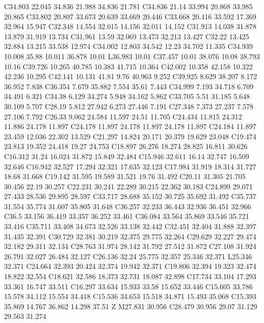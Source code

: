 {\begin{scope}[cm={0.569055,0,0,-0.569055,(-0.5cm,0.5cm)}]
{      C34.803 22.045 34.836 21.988 34.836 21.781 C34.836 21.14 33.994 20.868 33.985 20.865
      C33.802 20.807 33.673 20.639 33.669 20.446 C33.668 20.416 33.592 17.369 32.964 15.947
      C32.348 14.554 32.015 14.156 32.011 14.152 C31.913 14.038 31.878 13.879 31.919 13.734
      C31.961 13.59 32.069 13.473 32.213 13.427 C32.22 13.425 32.884 13.215 33.538 12.974
      C34.002 12.803 34.542 12.23 34.702 11.335 C34.939 10.008 35.88 10.011 36.878 10.01
      L36.983 10.01 C37.457 10.01 38.076 10.08 38.793 10.16
      C39.726 10.265 40.785 10.383 41.715 10.364 C42.002 10.358 42.158 10.322 42.236 10.295
      C42.141 10.131 41.81 9.76 40.963 9.252 C39.925 8.629 38.207 8.172 36.952 7.838
      C36.354 7.679 35.882 7.554 35.61 7.443 C34.999 7.193 34.718 6.709 34.491 6.321
      C34.38 6.129 34.274 5.948 34.162 5.862 C33.705 5.51 31.185 5.648 30.109 5.707
      C28.19 5.812 27.942 6.273 27.446 7.191 C27.348 7.373 27.237 7.578 27.106 7.792
      C26.33 9.062 24.584 11.597 24.51 11.705 C24.434 11.815 24.312 11.886 24.178 11.897
      C24.178 11.897 24.178 11.897 24.178 11.897 C24.184 11.897 23.459 12.036 22.302 13.529
      C21.297 14.824 20.171 20.379 19.629 23.048 C19.474 23.813 19.352 24.418 19.27 24.753
      C18.897 26.276 18.274 28.825 16.811 30.626 C16.312 31.24 16.024 31.872 15.849 32.484
      C15.946 32.611 16.14 32.747 16.509 32.646 C16.942 32.527 17.294 32.321 17.635 32.123
      C17.984 31.919 18.314 31.727 18.68 31.668 C19.142 31.595 19.589 31.521 19.76 31.492
      C20.11 31.305 21.705 30.456 22.19 30.257 C22.231 30.241 22.289 30.215 22.362 30.183
      C24.899 29.071 27.433 28.536 29.895 28.597 C33.717 28.688 35.152 30.725 35.692 31.492
      C35.737 31.554 35.774 31.607 35.805 31.648 C36.257 32.233 36.443 32.936 36.451 32.966
      C36.5 33.156 36.419 33.357 36.252 33.461 C36.084 33.564 35.869 33.546 35.721 33.416
      C35.711 33.408 34.673 32.526 33.138 32.442 C32.451 32.404 31.888 32.397 31.435 32.391
      C30.729 32.381 30.219 32.375 29.775 32.264 C29.629 32.227 29.474 32.182 29.311 32.134
      C28.763 31.974 28.142 31.792 27.512 31.872 C27.108 31.924 26.791 32.027 26.484 32.127
      C26.136 32.24 25.775 32.357 25.346 32.371 L25.346 32.371
      C24.664 32.393 20.424 32.374 19.942 32.371 C19.806 32.394 19.323 32.474 18.822 32.554
      C18.621 32.586 18.373 32.731 18.087 32.898 C17.734 33.104 17.293 33.361 16.747 33.511
      C16.297 33.634 15.933 33.58 15.652 33.446 C15.605 33.786 15.578 34.112 15.554 34.418
      C15.536 34.653 15.518 34.871 15.493 35.068 C15.393 35.869 14.767 36.862 14.298 37.51 Z
      M27.831 30.956 C28.479 30.956 29.07 31.129 29.563 31.274
}
\end{scope}}
